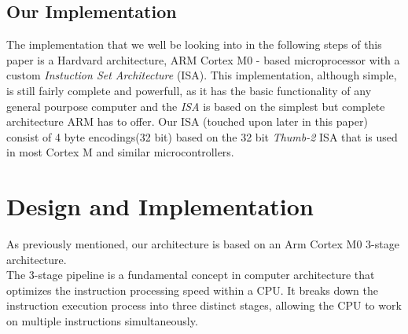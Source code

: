 \documentclass[9pt,a4paper,twoside]{tau}
\begin{document}
    \subsection{Our Implementation}
    The implementation that we well be looking into in the following steps of this paper is a Hardvard architecture, ARM Cortex M0 - based microprocessor with a custom \textit{Instuction Set Architecture} (ISA). 
    This implementation, although simple, is still fairly complete and powerfull, as it has the basic functionality of any general pourpose computer and the  \textit{ISA} is based on the simplest but complete architecture ARM has to offer. Our ISA (touched upon later in this paper) consist of 4 byte encodings(32 bit) based on the 32 bit  \textit{Thumb-2} ISA that is used in most Cortex M and similar microcontrollers.
    
    

\section{Design and Implementation}
    As previously mentioned, our architecture is based on an Arm Cortex M0 3-stage architecture. \\
    The 3-stage pipeline is a fundamental concept in computer architecture that optimizes the instruction processing speed within a CPU. It breaks down the instruction execution process into three distinct stages, allowing the CPU to work on multiple instructions simultaneously.\\
\end{document}
